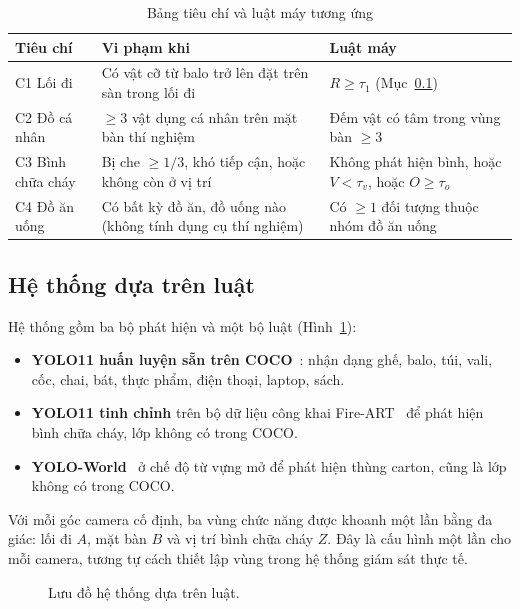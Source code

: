 \documentclass[conference]{IEEEtran}
\begin{document}
\begin{table}[t]
\centering
\caption{Bảng tiêu chí và luật máy tương ứng}
\label{tab:rubric}
\footnotesize
\begin{tabular}{p{0.9cm}p{3.3cm}p{3.1cm}}
\toprule
Tiêu chí & Vi phạm khi & Luật máy \\
\midrule
C1 Lối đi & Có vật cỡ từ balo trở lên đặt trên sàn trong lối đi & $R \ge \tau_1$ (Mục~\ref{sec:rules}) \\
C2 Đồ cá nhân & $\ge 3$ vật dụng cá nhân trên mặt bàn thí nghiệm & Đếm vật có tâm trong vùng bàn $\ge 3$ \\
C3 Bình chữa cháy & Bị che $\ge 1/3$, khó tiếp cận, hoặc không còn ở vị trí & Không phát hiện bình, hoặc $V < \tau_v$, hoặc $O \ge \tau_o$ \\
C4 Đồ ăn uống & Có bất kỳ đồ ăn, đồ uống nào (không tính dụng cụ thí nghiệm) & Có $\ge 1$ đối tượng thuộc nhóm đồ ăn uống \\
\bottomrule
\end{tabular}
\end{table}

\subsection{Hệ thống dựa trên luật}
\label{sec:rules}
Hệ thống gồm ba bộ phát hiện và một bộ luật (Hình~\ref{fig:rules}):
\begin{itemize}
  \item \textbf{YOLO11 huấn luyện sẵn trên COCO}~\cite{lin2014coco,ultralytics}: nhận dạng ghế, balo, túi, vali, cốc, chai, bát, thực phẩm, điện thoại, laptop, sách.
  \item \textbf{YOLO11 tinh chỉnh} trên bộ dữ liệu công khai Fire-ART~\cite{wen2025fireart} để phát hiện bình chữa cháy, lớp không có trong COCO.
  \item \textbf{YOLO-World}~\cite{cheng2024yoloworld} ở chế độ từ vựng mở để phát hiện thùng carton, cũng là lớp không có trong COCO.
\end{itemize}
Với mỗi góc camera cố định, ba vùng chức năng được khoanh một lần bằng đa giác: lối đi $A$, mặt bàn $B$ và vị trí bình chữa cháy $Z$. Đây là cấu hình một lần cho mỗi camera, tương tự cách thiết lập vùng trong hệ thống giám sát thực tế.

\begin{figure}[t]
\centering
{}
\caption{Lưu đồ hệ thống dựa trên luật.}
\label{fig:rules}
\end{figure}
\end{document}
